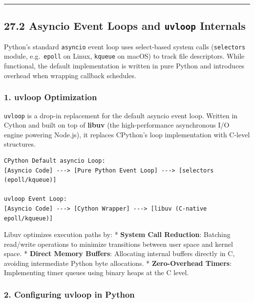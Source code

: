 \begin{center}\rule{0.5\linewidth}{0.5pt}\end{center}

\hypertarget{asyncio-event-loops-and-uvloop-internals}{%
\subsection{\texorpdfstring{27.2 Asyncio Event Loops and \texttt{uvloop}
Internals}{27.2 Asyncio Event Loops and uvloop Internals}}\label{asyncio-event-loops-and-uvloop-internals}}

Python's standard \passthrough{\lstinline!asyncio!} event loop uses
select-based system calls (\passthrough{\lstinline!selectors!} module,
e.g.~\passthrough{\lstinline!epoll!} on Linux,
\passthrough{\lstinline!kqueue!} on macOS) to track file descriptors.
While functional, the default implementation is written in pure Python
and introduces overhead when wrapping callback schedules.

\hypertarget{uvloop-optimization}{%
\subsubsection{1. uvloop Optimization}\label{uvloop-optimization}}

\passthrough{\lstinline!uvloop!} is a drop-in replacement for the
default asyncio event loop. Written in Cython and built on top of
\textbf{libuv} (the high-performance asynchronous I/O engine powering
Node.js), it replaces CPython's loop implementation with C-level
structures.

\begin{lstlisting}
CPython Default asyncio Loop:
[Asyncio Code] ---> [Pure Python Event Loop] ---> [selectors (epoll/kqueue)]

uvloop Event Loop:
[Asyncio Code] ---> [Cython Wrapper] ---> [libuv (C-native epoll/kqueue)]
\end{lstlisting}

Libuv optimizes execution paths by: * \textbf{System Call Reduction}:
Batching read/write operations to minimize transitions between user
space and kernel space. * \textbf{Direct Memory Buffers}: Allocating
internal buffers directly in C, avoiding intermediate Python byte
allocations. * \textbf{Zero-Overhead Timers}: Implementing timer queues
using binary heaps at the C level.

\hypertarget{configuring-uvloop-in-python}{%
\subsubsection{2. Configuring uvloop in
Python}\label{configuring-uvloop-in-python}}

